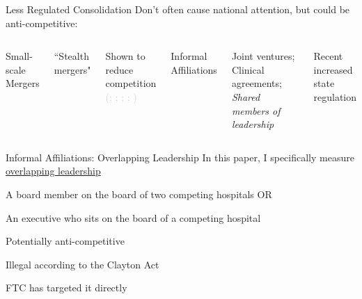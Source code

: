 \documentclass[notes,11pt, aspectratio=169]{beamer}
\newenvironment{wideitemize}{\itemize\addtolength{\itemsep}{10pt}}{\enditemize}
\begin{document}
\begin{frame}{Less Regulated Consolidation}
    Don't often cause national attention, but could be anti-competitive:

    \vspace{7mm}

    \begin{columns}[T]
        \centering
        \textcolor{eggplant}{Small-scale Mergers}

        \vspace{3mm}

        \begin{wideitemize}
        \item ``Stealth mergers"
            \item Shown to reduce competition \\ \small \textcolor{lightgray}{(\cite{majerovitz2021consolidation}; \cite{aggarwal2025stealth}; \cite{wollmann2019stealth}; \cite{wollmann2020get}; \cite{kepler2023stealth})} \large
        \end{wideitemize}

        \centering
        \textcolor{eggplant}{Informal Affiliations}

        \vspace{3mm}

        \begin{wideitemize}
            \item Joint ventures; Clinical agreements; \textit{Shared members of leadership}
            \item Recent increased state regulation
        \end{wideitemize}
    \end{columns}
\end{frame}

\begin{frame}{Informal Affiliations: Overlapping Leadership}
    In this paper, I specifically measure \underline{overlapping leadership}

    \vspace{2mm}
    \begin{wideitemize}
        \item A board member on the board of two competing hospitals OR
        \item An executive who sits on the board of a competing hospital
    \end{wideitemize}

    \vspace{8mm} 

    Potentially anti-competitive

    \vspace{2mm}
    \begin{wideitemize}
        \item Illegal according to the Clayton Act
        \item FTC has targeted it directly
    \end{wideitemize}

\end{frame}
\end{document}
